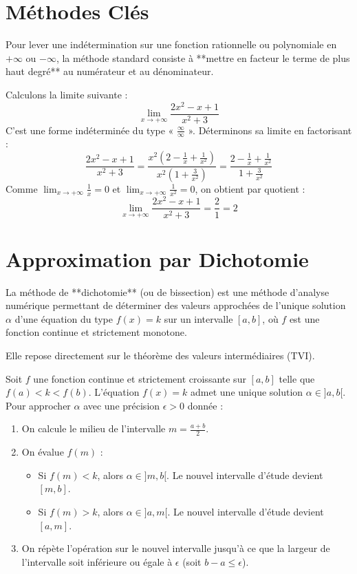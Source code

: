 \section{Méthodes Clés}

\begin{methode}
Pour lever une indétermination sur une fonction rationnelle ou polynomiale en $+\infty$ ou $-\infty$, la méthode standard consiste à **mettre en facteur le terme de plus haut degré** au numérateur et au dénominateur.
\end{methode}

\begin{exemple}
Calculons la limite suivante :
\[
\lim_{x \to +\infty} \frac{2x^2 - x + 1}{x^2 + 3}
\]
C'est une forme indéterminée du type « $\frac{\infty}{\infty}$ ». Déterminons sa limite en factorisant :
\[
\frac{2x^2 - x + 1}{x^2 + 3} = \frac{x^2 \left(2 - \frac{1}{x} + \frac{1}{x^2}\right)}{x^2 \left(1 + \frac{3}{x^2}\right)} = \frac{2 - \frac{1}{x} + \frac{1}{x^2}}{1 + \frac{3}{x^2}}
\]
Comme $\lim_{x \to +\infty} \frac{1}{x} = 0$ et $\lim_{x \to +\infty} \frac{1}{x^2} = 0$, on obtient par quotient :
\[
\lim_{x \to +\infty} \frac{2x^2 - x + 1}{x^2 + 3} = \frac{2}{1} = 2
\]
\end{exemple}

\section{Approximation par Dichotomie}

La méthode de **dichotomie** (ou de bissection) est une méthode d'analyse numérique permettant de déterminer des valeurs approchées de l'unique solution $\alpha$ d'une équation du type $f(x) = k$ sur un intervalle $[a, b]$, où $f$ est une fonction continue et strictement monotone.

Elle repose directement sur le théorème des valeurs intermédiaires (TVI).

\begin{definition}
Soit $f$ une fonction continue et strictement croissante sur $[a, b]$ telle que $f(a) < k < f(b)$. L'équation $f(x) = k$ admet une unique solution $\alpha \in ]a, b[$.
Pour approcher $\alpha$ avec une précision $\epsilon > 0$ donnée :
\begin{enumerate}
    \item On calcule le milieu de l'intervalle $m = \frac{a+b}{2}$.
    \item On évalue $f(m)$ :
    \begin{itemize}
        \item Si $f(m) < k$, alors $\alpha \in ]m, b[$. Le nouvel intervalle d'étude devient $[m, b]$.
        \item Si $f(m) > k$, alors $\alpha \in ]a, m[$. Le nouvel intervalle d'étude devient $[a, m]$.
    \end{itemize}
    \item On répète l'opération sur le nouvel intervalle jusqu'à ce que la largeur de l'intervalle soit inférieure ou égale à $\epsilon$ (soit $b - a \le \epsilon$).
\end{enumerate}
\end{definition}

